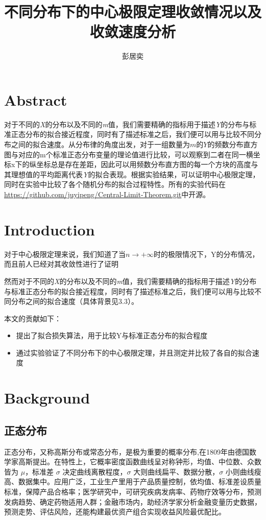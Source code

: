 \documentclass{article}
\title{不同分布下的中心极限定理收敛情况以及收敛速度分析}
\author{彭居奕}
\begin{document}
\maketitle
\section{Abstract}
对于不同的\textit{X}的分布以及不同的\textit{m}值，我们需要精确的指标用于描述\textit{Y}的分布与标准正态分布的拟合接近程度，同时有了描述标准之后，我们便可以用与比较不同分布之间的拟合速度。从分布律的角度出发，对于一组数量为$m$的$Y$的频数分布直方图与对应的m个标准正态分布变量的理论值进行比较，可以观察到二者在同一横坐标x下的纵坐标总是存在差距，因此可以用频数分布直方图的每一个方块的高度与其理想值的平均距离代表\textit{Y}的拟合表现。根据实验结果，可以证明中心极限定理，同时在实验中比较了各个随机分布的拟合过程特性。所有的实验代码在\url{https://github.com/juyipeng/Central-Limit-Theorem.git}中开源。
\section{Introduction}

对于中心极限定理\cite{laplace}来说，我们知道了当$n\to+\infty$时的极限情况下，Y的分布情况，而且前人已经对其收敛性进行了证明\cite{Liapounov1901}

然而对于不同的\textit{X}的分布以及不同的\textit{m}值，我们需要精确的指标用于描述\textit{Y}的分布与标准正态分布的拟合接近程度，同时有了描述标准之后，我们便可以用与比较不同分布之间的拟合速度（具体背景见3.3）。

本文的贡献如下：
\begin{itemize}
\item 提出了拟合损失算法，用于比较Y与标准正态分布的拟合程度
\item 通过实验验证了不同分布下的中心极限定理，并且测定并比较了各自的拟合速度
\end{itemize}



\section{Background}

\subsection{正态分布}
正态分布\cite{gauss}，又称高斯分布或常态分布，是极为重要的概率分布,在1809年由德国数学家高斯提出。在特性上，它概率密度函数曲线呈对称钟形，均值、中位数、众数皆为 $\mu$，标准差 $\sigma$ 决定曲线离散程度，$\sigma$ 大则曲线扁平、数据分散，$\sigma$ 小则曲线瘦高、数据集中。应用广泛，工业生产里用于产品质量控制，依均值、标准差设质量标准，保障产品合格率；医学研究中，可研究疾病发病率、药物疗效等分布，预测发病趋势、确定药物适用人群；金融市场内，助经济学家分析金融变量历史数据，预测走势、评估风险，还能构建最优资产组合实现收益风险最优配比。
\end{document}
